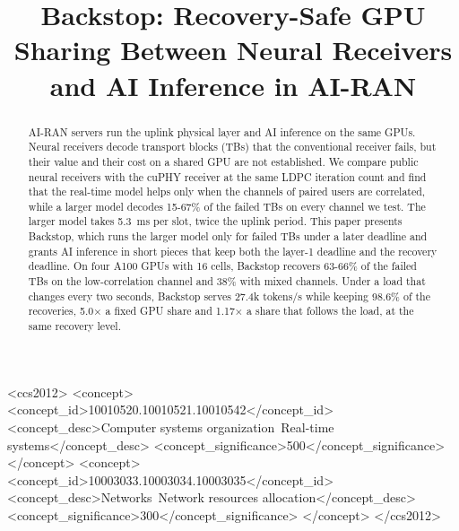 \documentclass[acmsmall,screen,review,anonymous]{acmart}
\newcommand{\sys}{Backstop\xspace}
\begin{document}
\title[Backstop: Recovery-Safe GPU Sharing in AI-RAN]{Backstop: Recovery-Safe GPU Sharing Between
Neural Receivers and AI Inference in AI-RAN}


\begin{CCSXML}
<ccs2012>
 <concept>
  <concept_id>10010520.10010521.10010542</concept_id>
  <concept_desc>Computer systems organization~Real-time systems</concept_desc>
  <concept_significance>500</concept_significance>
 </concept>
 <concept>
  <concept_id>10003033.10003034.10003035</concept_id>
  <concept_desc>Networks~Network resources allocation</concept_desc>
  <concept_significance>300</concept_significance>
 </concept>
</ccs2012>
\end{CCSXML}



\begin{abstract}
AI-RAN servers run the uplink physical layer and AI inference on the same GPUs. Neural receivers decode
transport blocks (TBs) that the conventional receiver fails, but their value and their cost on a shared
GPU are not established. We compare public neural receivers with the cuPHY receiver at the same LDPC
iteration count and find that the real-time model helps only when the channels of paired users are
correlated, while a larger model decodes 15-67\% of the failed TBs on every channel we test. The larger
model takes 5.3~ms per slot, twice the uplink period. This paper presents \sys, which runs the larger model
only for failed TBs under a later deadline and grants AI inference in short pieces that keep both the
layer-1 deadline and the recovery deadline. On four A100 GPUs with 16 cells, \sys recovers 63-66\% of the
failed TBs on the low-correlation channel and 38\% with mixed channels. Under a load that changes every two
seconds, \sys serves 27.4k tokens/s while keeping 98.6\% of
the recoveries, 5.0$\times$ a fixed GPU share and 1.17$\times$ a share that follows the load, at the same
recovery level.
\end{abstract}

\maketitle
\end{document}
